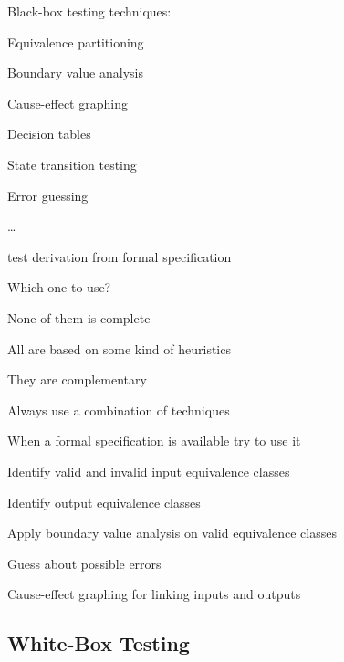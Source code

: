 \begin{itemize*}
	\item Black-box testing techniques:
	\begin{itemize*}
		\item Equivalence partitioning
		\item Boundary value analysis
		\item Cause-effect graphing
		\item Decision tables
		\item State transition testing
		\item Error guessing
        \item \ldots
		\begin{itemize*}
			\item test derivation from formal specification
		\end{itemize*}
	\end{itemize*}
	\item Which one to use?
	\begin{itemize*}
		\item None of them is complete
		\item All are based on some kind of heuristics
		\item They are complementary
	\end{itemize*}
	\item Always use a combination of techniques
	\begin{itemize*}
		\item When a formal specification is available try to use it
		\item Identify valid and invalid input equivalence classes
		\item Identify output equivalence classes
		\item Apply boundary value analysis on valid equivalence classes
		\item Guess about possible errors
		\item Cause-effect graphing for linking inputs and outputs
	\end{itemize*}
\end{itemize*}

\subsection{White-Box Testing}

